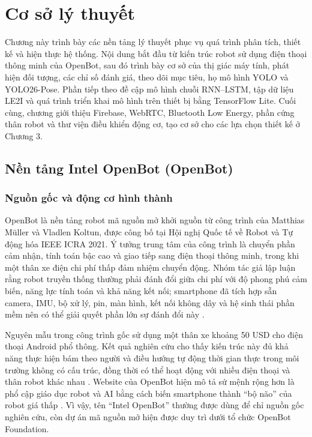 \section{Cơ sở lý thuyết}

Chương này trình bày các nền tảng lý thuyết phục vụ quá trình phân tích, thiết kế và hiện thực hệ thống. Nội dung bắt đầu từ kiến trúc robot sử dụng điện thoại thông minh của OpenBot, sau đó trình bày cơ sở của thị giác máy tính, phát hiện đối tượng, các chỉ số đánh giá, theo dõi mục tiêu, họ mô hình YOLO và YOLO26-Pose. Phần tiếp theo đề cập mô hình chuỗi RNN--LSTM, tập dữ liệu LE2I và quá trình triển khai mô hình trên thiết bị bằng TensorFlow Lite. Cuối cùng, chương giới thiệu Firebase, WebRTC, Bluetooth Low Energy, phần cứng thân robot và thư viện điều khiển động cơ, tạo cơ sở cho các lựa chọn thiết kế ở Chương 3.

\subsection{Nền tảng Intel OpenBot (OpenBot)}
\iffalse

\subsubsection{Nguồn gốc và động cơ hình thành}

OpenBot là nền tảng robot mã nguồn mở khởi nguồn từ công trình của Matthias Müller và Vladlen Koltun, được công bố tại Hội nghị Quốc tế về Robot và Tự động hóa IEEE ICRA 2021. Ý tưởng trung tâm của công trình là chuyển phần cảm nhận, tính toán bậc cao và giao tiếp sang điện thoại thông minh, trong khi một thân xe điện chi phí thấp đảm nhiệm chuyển động. Nhóm tác giả lập luận rằng robot truyền thống thường phải đánh đổi giữa chi phí với độ phong phú cảm biến, năng lực tính toán và khả năng kết nối; smartphone đã tích hợp sẵn camera, IMU, bộ xử lý, pin, màn hình, kết nối không dây và hệ sinh thái phần mềm nên có thể giải quyết phần lớn sự đánh đổi này .

Nguyên mẫu trong công trình gốc sử dụng một thân xe khoảng 50 USD cho điện thoại Android phổ thông. Kết quả nghiên cứu cho thấy kiến trúc này đủ khả năng thực hiện bám theo người và điều hướng tự động thời gian thực trong môi trường không có cấu trúc, đồng thời có thể hoạt động với nhiều điện thoại và thân robot khác nhau . Website của OpenBot hiện mô tả sứ mệnh rộng hơn là phổ cập giáo dục robot và AI bằng cách biến smartphone thành ``bộ não'' của robot giá thấp . Vì vậy, tên ``Intel OpenBot'' thường được dùng để chỉ nguồn gốc nghiên cứu, còn dự án mã nguồn mở hiện được duy trì dưới tổ chức OpenBot Foundation.

